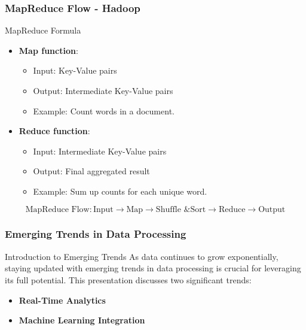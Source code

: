 \documentclass[aspectratio=169]{beamer}
\begin{document}
\begin{frame}[fragile]
    \frametitle{MapReduce Flow - Hadoop}
    \begin{block}{MapReduce Formula}
        \begin{itemize}
            \item \textbf{Map function}: 
            \begin{itemize}
                \item Input: Key-Value pairs
                \item Output: Intermediate Key-Value pairs
                \item Example: Count words in a document.
            \end{itemize}
            \item \textbf{Reduce function}:
            \begin{itemize}
                \item Input: Intermediate Key-Value pairs
                \item Output: Final aggregated result
                \item Example: Sum up counts for each unique word.
            \end{itemize}
        \end{itemize}
        \begin{equation}
            \text{MapReduce Flow} : \text{Input} \rightarrow \text{Map} \rightarrow \text{Shuffle \& Sort} \rightarrow \text{Reduce} \rightarrow \text{Output}
        \end{equation}
    \end{block}
\end{frame}

\begin{frame}[fragile]
    \frametitle{Emerging Trends in Data Processing}
    \begin{block}{Introduction to Emerging Trends}
        As data continues to grow exponentially, staying updated with emerging trends in data processing is crucial for leveraging its full potential. This presentation discusses two significant trends: 
        \begin{itemize}
            \item \textbf{Real-Time Analytics}
            \item \textbf{Machine Learning Integration}
        \end{itemize}
    \end{block}
\end{frame}
\end{document}
